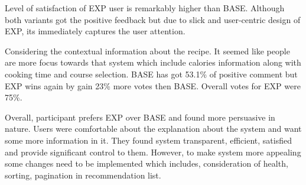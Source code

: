 Level of satisfaction of EXP user is remarkably higher than BASE. Although both variants got the positive feedback but due to slick and user-centric design of EXP, its immediately captures the user attention.\newline


Considering the contextual information about the recipe. It seemed like people are more focus towards that system which include calories information along with cooking time and course selection. BASE has got 53.1\% of positive comment but EXP wins again by gain 23\% more votes then BASE. Overall votes for EXP were 75\%.  

Overall, participant prefers EXP over BASE and found more persuasive in nature. Users were comfortable about the explanation about the system and want some more information in it. They found system transparent, efficient, satisfied and provide significant control to them. However, to make system more appealing some changes need to be implemented which includes, consideration of health, sorting, pagination in recommendation list.  